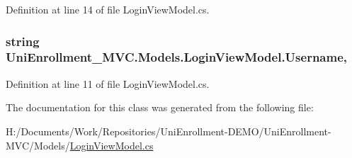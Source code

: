Definition at line 14 of file Login\+View\+Model.\+cs.

\subsubsection[{\texorpdfstring{Username}{Username}}]{\setlength{\rightskip}{0pt plus 5cm}string Uni\+Enrollment\+\_\+\+M\+V\+C.\+Models.\+Login\+View\+Model.\+Username\hspace{0.3cm}{\ttfamily [get]}, {\ttfamily [set]}}\hypertarget{class_uni_enrollment___m_v_c_1_1_models_1_1_login_view_model_a2a2dfafa311682f75f090f507feede8b}{}\label{class_uni_enrollment___m_v_c_1_1_models_1_1_login_view_model_a2a2dfafa311682f75f090f507feede8b}


Definition at line 11 of file Login\+View\+Model.\+cs.



The documentation for this class was generated from the following file\+:\begin{DoxyCompactItemize}
\item 
H\+:/\+Documents/\+Work/\+Repositories/\+Uni\+Enrollment-\/\+D\+E\+M\+O/\+Uni\+Enrollment-\/\+M\+V\+C/\+Models/\hyperlink{_login_view_model_8cs}{Login\+View\+Model.\+cs}\end{DoxyCompactItemize}
